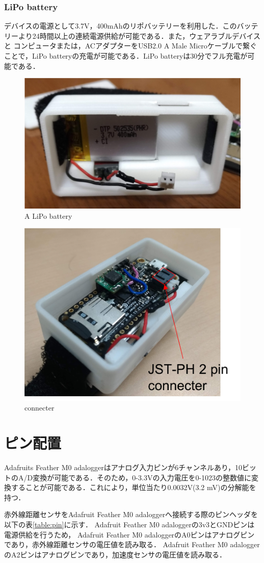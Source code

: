 \subsubsection*{LiPo battery}
デバイスの電源として3.7V，400mAhのリポバッテリーを利用した．このバッテリーより24時間以上の連続電源供給が可能である．また，ウェアラブルデバイスと
コンピュータまたは，ACアダプターをUSB2.0 A Male Microケーブルで繋ぐことで，LiPo batteryの充電が可能である．LiPo batteryは30分でフル充電が可能である．
\begin{figure}[H]
  \centering
  \includegraphics[width=0.5\linewidth]{fig/battery}
  \caption{A LiPo battery}
  \label{fig:battery}
\end{figure}

\begin{figure}[H]
  \centering
  \includegraphics[width=0.5\linewidth]{fig/ph}
  \caption{connecter}
  \label{fig:connecter}
\end{figure}

\section{ピン配置}
Adafruits Feather M0 adaloggerはアナログ入力ピンが6チャンネルあり，10ビットのA/D変換が可能である．そのため，0-3.3Vの入力電圧を0-1023の整数値に変換することが可能である．これにより，単位当たり0.0032V(3.2 mV)の分解能を持つ．

赤外線距離センサをAdafruit Feather M0 adaloggerへ接続する際のピンヘッダを以下の表\ref{table:pin}に示す．
Adafruit Feather M0 adaloggerの3v3とGNDピンは電源供給を行うため，
Adafruit Feather M0 adaloggerのA0ピンはアナログピンであり，赤外線距離センサの電圧値を読み取る．
Adafruit Feather M0 adaloggerのA2ピンはアナログピンであり，加速度センサの電圧値を読み取る．

